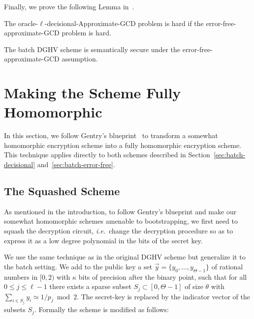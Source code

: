 \documentclass[11pt]{llncs}
\newcommand{\ie}{\textsl{i.e.}\xspace}
\renewcommand\leq\leqslant
\begin{document}
Finally, we prove the following Lemma in~\cite[Appendix~C]{CLT2013a}.

\begin{lemma}
\label{l:redsec}
The oracle-$\ell$-decisional-Approximate-GCD problem is hard if the
error-free-approximate-GCD problem is hard.
\end{lemma}

\begin{corollary}
The batch DGHV scheme is semantically secure under the
error-free-approximate-GCD assumption.
\end{corollary}


\section{Making the Scheme Fully Homomorphic}

In this section, we follow Gentry's blueprint~\cite{GenPhD} to
transform a somewhat homomorphic encryption scheme into a fully
homomorphic encryption scheme. This technique applies directly to 
both schemes described in Section~\ref{sec:batch-decisional} 
and~\ref{sec:batch-error-free}.

\subsection{The Squashed Scheme}\label{subsec:squashing}

As mentioned in the introduction, to follow Gentry's blueprint and make
our somewhat homomorphic schemes amenable to bootstrapping, we first need
to squash the decryption circuit, \ie~change the decryption procedure
so as to express it as a low degree polynomial in the bits of the secret
key.

We use the same technique as in the original DGHV scheme
\cite{vDGHV2010} but generalize it to 
the batch setting. We add to the public key a set  $\vec y=\{ y_0,
\ldots, y_{\Theta-1} \}$ of rational numbers in $[0, 2)$ with $\kappa$
  bits of precision after the binary point, such that for all  $0 \leq
  j \leq \ell-1$ there exists a sparse subset $S_j \subset
  [0,\Theta-1]$ of size $\theta$ with $\sum_{i\in S_j}y_i\simeq
  1/p_j\bmod 2$.
The secret-key is replaced by the indicator vector of the subsets
$S_j$. Formally the scheme is modified as follows:
\end{document}
